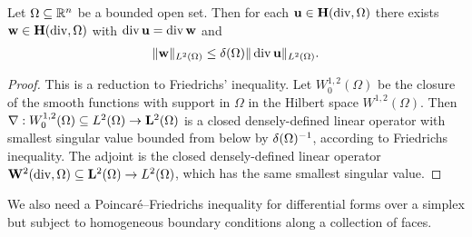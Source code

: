 \documentclass[10pt,letterpaper]{article}
\begin{document}
\begin{lemma}\label{lemma:PFfordivergence}
    Let $\Omega \subseteq {\mathbb R}^{n}$ be a bounded open set. 
    Then for each ${\mathbf u} \in {\mathbf H}(\operatorname{div},\Omega)$ there exists ${\mathbf w} \in {\mathbf H}(\operatorname{div},\Omega)$ with $\operatorname{div} {\mathbf u} = \operatorname{div} {\mathbf w}$ and 
    \begin{align*}
        \| {\mathbf w} \|_{L^{2}(\Omega)} 
        \leq 
        {\delta}(\Omega) \| \operatorname{div} {\mathbf u} \|_{L^{2}(\Omega)}
        .
    \end{align*}
\end{lemma}
\begin{proof}
    This is a reduction to Friedrichs' inequality. 
    Let $W^{1,2}_{0}(\Omega)$ be the closure of the smooth functions with support in $\Omega$ in the Hilbert space $W^{1,2}(\Omega)$. 
    Then $\nabla : W^{1,2}_{0}(\Omega) \subseteq L^{2}(\Omega) \rightarrow {\mathbf L}^{2}(\Omega)$ is a closed densely-defined linear operator 
    with smallest singular value bounded from below by ${\delta}(\Omega)^{-1}$, according to Friedrichs inequality. 
    The adjoint is the closed densely-defined linear operator ${\mathbf W}^{2}(\operatorname{div},\Omega) \subseteq {\mathbf L}^{2}(\Omega) \rightarrow L^{2}(\Omega)$,
    which has the same smallest singular value. 
\end{proof}





We also need a Poincar\'e--Friedrichs inequality for differential forms over a simplex but subject to homogeneous boundary conditions along a collection of faces. 
\end{document}
